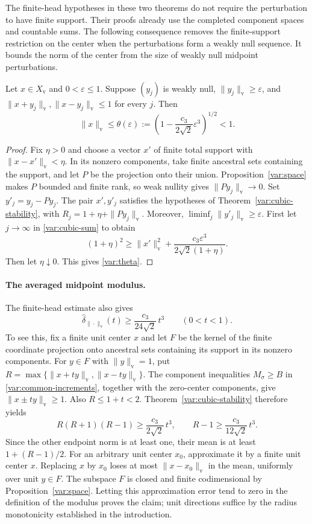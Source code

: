 The finite-head hypotheses in these two theorems do not require
the perturbation to have finite support.  Their proofs already use
the completed component spaces and countable sums.  The following
consequence removes the finite-support restriction on the center
when the perturbations form a weakly null sequence. It bounds the norm
of the center from the size of weakly null midpoint perturbations.

\begin{proposition}\label{var:cubic-weak-null}
Let $x\in X_{\mathrm v}$ and $0<\varepsilon\le1$.  Suppose
$(y_j)$ is weakly null,
$\|y_j\|_{\mathrm v}\ge\varepsilon$, and
$\|x+y_j\|_{\mathrm v},\|x-y_j\|_{\mathrm v}\le1$ for every $j$.
Then
\begin{equation}\label{var:theta}
 \|x\|_{\mathrm v}\le\theta(\varepsilon)
 :=\left(1-\frac{c_3}{2\sqrt2}\varepsilon^3\right)^{1/2}<1.
\end{equation}
\end{proposition}

\begin{proof}
Fix $\eta>0$ and choose a vector $x'$ of finite total support with
$\|x-x'\|_{\mathrm v}<\eta$.  In its nonzero components, take
finite ancestral sets containing the support, and let $P$ be the
projection onto their union.  Proposition~\ref{var:space} makes
$P$ bounded and finite rank, so weak nullity gives
$\|Py_j\|_{\mathrm v}\to0$.  Set $y'_j=y_j-Py_j$.
The pair $x',y'_j$ satisfies the hypotheses of
Theorem~\ref{var:cubic-stability}, with
$R_j=1+\eta+\|Py_j\|_{\mathrm v}$.  Moreover,
$\liminf_j\|y'_j\|_{\mathrm v}\ge\varepsilon$.
First let $j\to\infty$ in \eqref{var:cubic-sum} to obtain
\[
 (1+\eta)^2\ge\|x'\|_{\mathrm v}^2+
          \frac{c_3\varepsilon^3}{2\sqrt2(1+\eta)}.
\]
Then let $\eta\downarrow0$.  This gives \eqref{var:theta}.
\end{proof}

\paragraph{The averaged midpoint modulus.}
The finite-head estimate also gives
\[
 \widehat\delta_{\|\cdot\|_{\mathrm v}}(t)
 \ge\frac{c_3}{24\sqrt2}\,t^3\qquad(0<t<1).
\]
To see this, fix a finite unit center $x$ and let $F$ be the kernel of
the finite coordinate projection onto ancestral sets containing its
support in its nonzero components. For $y\in F$ with
$\|y\|_{\mathrm v}=1$, put
$R=\max\{\|x+ty\|_{\mathrm v},\|x-ty\|_{\mathrm v}\}$.
The component inequalities $M_\sigma\ge B$ in
\eqref{var:common-increments}, together with the zero-center
components, give $\|x\pm ty\|_{\mathrm v}\ge1$. Also
$R\le1+t<2$. Theorem~\ref{var:cubic-stability} therefore yields
\[
 R(R+1)(R-1)\ge\frac{c_3}{2\sqrt2}\,t^3,
 \qquad R-1\ge\frac{c_3}{12\sqrt2}\,t^3.
\]
Since the other endpoint norm is at least one, their mean is at least
$1+(R-1)/2$. For an arbitrary unit center $x_0$, approximate it by a
finite unit center $x$. Replacing $x$ by $x_0$ loses at most
$\|x-x_0\|_{\mathrm v}$ in the mean, uniformly over unit $y\in F$.
The subspace $F$ is closed and finite codimensional by
Proposition~\ref{var:space}. Letting this approximation error tend to
zero in the definition of the modulus proves the claim; unit
directions suffice by the radius monotonicity established in the
introduction.
